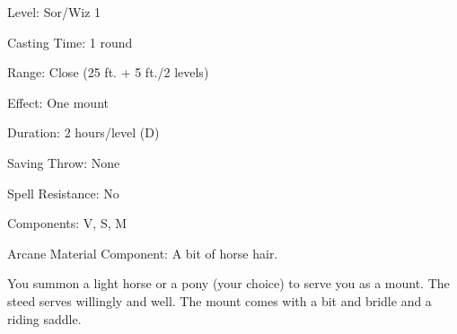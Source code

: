 
\begin{description*}
\item[Level:] Sor/Wiz 1
\item[Casting Time:] 1 round
\item[Range:] Close (25 ft. + 5 ft./2 levels)
\item[Effect:] One mount
\item[Duration:] 2 hours/level (D)
\item[Saving Throw:] None
\item[Spell Resistance:] No
\item[Components:] V, S, M
\item[Arcane Material Component:] A bit of horse hair.
\end{description*}

You summon a light horse or a pony (your choice) to serve you as a mount. The steed
serves willingly and well. The mount comes with a bit and bridle and a riding saddle.